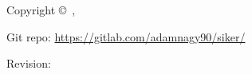 \pagestyle{plain}
\thispagestyle{empty}
\begin{center}
\textsc{\theauthor}

\textsc{\thetitle}
\end{center}

\newpage\thispagestyle{empty}

\noindent Copyright \copyright~\theauthor, \thedate

\vspace{1cm}
\noindent Git repo: \href{https://gitlab.com/adamnagy90/siker/}{https://gitlab.com/adamnagy90/siker/}

\noindent Revision: \gitVer{}

\maketitle
\newpage\thispagestyle{empty}

\cleardoublepage
\thispagestyle{empty}
\setcounter{page}{5}
\tableofcontents
